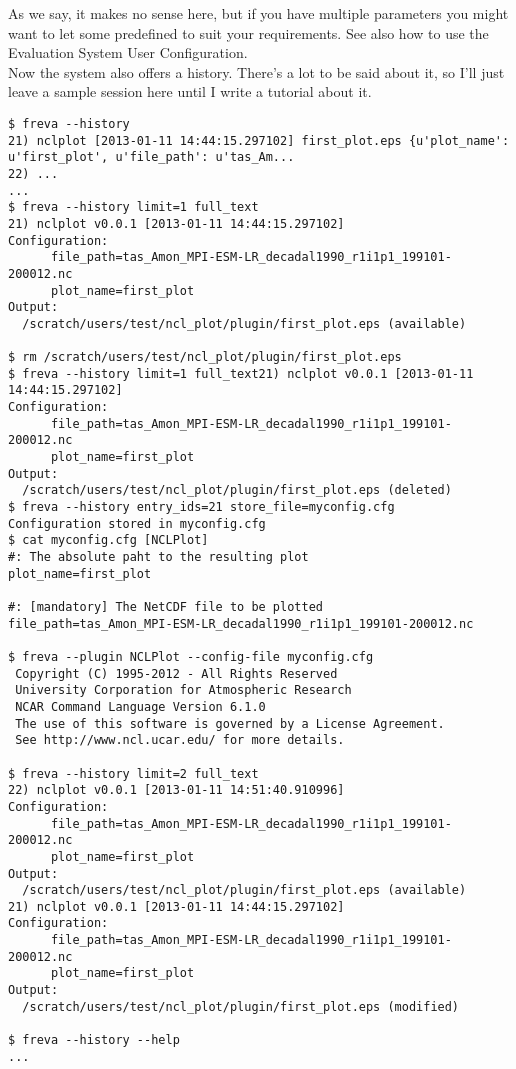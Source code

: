 \documentclass[a4paper,11pt]{ltxdoc}
\begin{document}
As we say, it makes no sense here, but if you have multiple parameters you might want to let some predefined to suit your requirements.
See also how to use the Evaluation System User Configuration.\\

Now the system also offers a history. There's a lot to be said about it, so I'll just leave a sample session here until I write a tutorial about it. \\
\begin{verbatim}
$ freva --history
21) nclplot [2013-01-11 14:44:15.297102] first_plot.eps {u'plot_name': u'first_plot', u'file_path': u'tas_Am...
22) ...
...
$ freva --history limit=1 full_text
21) nclplot v0.0.1 [2013-01-11 14:44:15.297102] 
Configuration:
      file_path=tas_Amon_MPI-ESM-LR_decadal1990_r1i1p1_199101-200012.nc
      plot_name=first_plot
Output:
  /scratch/users/test/ncl_plot/plugin/first_plot.eps (available)

$ rm /scratch/users/test/ncl_plot/plugin/first_plot.eps
$ freva --history limit=1 full_text21) nclplot v0.0.1 [2013-01-11 14:44:15.297102] 
Configuration:
      file_path=tas_Amon_MPI-ESM-LR_decadal1990_r1i1p1_199101-200012.nc
      plot_name=first_plot
Output:
  /scratch/users/test/ncl_plot/plugin/first_plot.eps (deleted)
$ freva --history entry_ids=21 store_file=myconfig.cfg
Configuration stored in myconfig.cfg
$ cat myconfig.cfg [NCLPlot]
#: The absolute paht to the resulting plot
plot_name=first_plot

#: [mandatory] The NetCDF file to be plotted
file_path=tas_Amon_MPI-ESM-LR_decadal1990_r1i1p1_199101-200012.nc

$ freva --plugin NCLPlot --config-file myconfig.cfg
 Copyright (C) 1995-2012 - All Rights Reserved
 University Corporation for Atmospheric Research
 NCAR Command Language Version 6.1.0
 The use of this software is governed by a License Agreement.
 See http://www.ncl.ucar.edu/ for more details.

$ freva --history limit=2 full_text
22) nclplot v0.0.1 [2013-01-11 14:51:40.910996] 
Configuration:
      file_path=tas_Amon_MPI-ESM-LR_decadal1990_r1i1p1_199101-200012.nc
      plot_name=first_plot
Output:
  /scratch/users/test/ncl_plot/plugin/first_plot.eps (available)
21) nclplot v0.0.1 [2013-01-11 14:44:15.297102] 
Configuration:
      file_path=tas_Amon_MPI-ESM-LR_decadal1990_r1i1p1_199101-200012.nc
      plot_name=first_plot
Output:
  /scratch/users/test/ncl_plot/plugin/first_plot.eps (modified)

$ freva --history --help
...
\end{verbatim}
\end{document}
